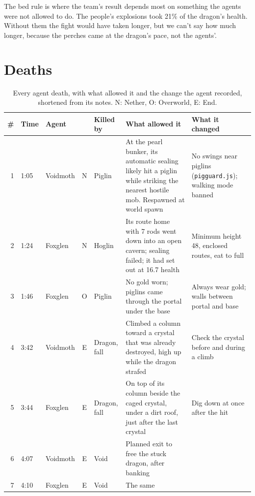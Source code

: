 \documentclass[11pt,a4paper]{article}
\begin{document}
The bed rule is where the team's result depends most on something the agents were not allowed to do. The people's explosions took 21\% of the dragon's health. Without them the fight would have taken longer, but we can't say how much longer, because the perches came at the dragon's pace, not the agents'.

\section{Deaths}
\label{sec:deaths}

\begin{table}[t]
  \caption{Every agent death, with what allowed it and the change the agent recorded, shortened from its notes. N: Nether, O: Overworld, E: End.}
  \label{tab:deaths}
  \footnotesize
  \setlength{\tabcolsep}{4pt}
  \begin{tabularx}{\textwidth}{@{}rllclXX@{}}
    \toprule
    \textbf{\#} & \textbf{Time} & \textbf{Agent} & & \textbf{Killed by} & \textbf{What allowed it} & \textbf{What it changed} \\
    \midrule
    1 & 1:05 & Voidmoth & N & Piglin & At the pearl bunker, its automatic sealing likely hit a piglin while striking the nearest hostile mob. Respawned at world spawn & No swings near piglins (\texttt{pigguard.js}); walking mode banned \\
    2 & 1:24 & Foxglen & N & Hoglin & Its route home with 7 rods went down into an open cavern; sealing failed; it had set out at 16.7 health & Minimum height 48, enclosed routes, eat to full \\
    3 & 1:46 & Foxglen & O & Piglin & No gold worn; piglins came through the portal under the base & Always wear gold; walls between portal and base \\
    4 & 3:42 & Voidmoth & E & Dragon, fall & Climbed a column toward a crystal that was already destroyed, high up while the dragon strafed & Check the crystal before and during a climb \\
    5 & 3:44 & Foxglen & E & Dragon, fall & On top of its column beside the caged crystal, under a dirt roof, just after the last crystal & Dig down at once after the hit \\
    6 & 4:07 & Voidmoth & E & Void & Planned exit to free the stuck dragon, after banking & \\
    7 & 4:10 & Foxglen & E & Void & The same & \\
    \bottomrule
  \end{tabularx}
\end{table}
\end{document}
